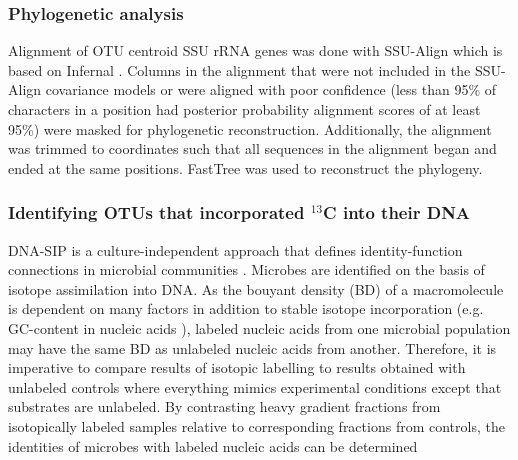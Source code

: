 \subsubsection{Phylogenetic analysis}
Alignment of OTU centroid SSU rRNA genes was done with SSU-Align which is based on Infernal
\citep{Nawrocki_2013,Nawrocki_2009}. Columns in the alignment that were not included in
the SSU-Align covariance models or were aligned with poor confidence (less than
95\% of characters in a position had posterior probability alignment scores of
at least 95\%) were masked for phylogenetic reconstruction. Additionally, the
alignment was trimmed to coordinates such that all sequences in the alignment
began and ended at the same positions. FastTree \citep{Price_2009} was used to
reconstruct the phylogeny.

\subsubsection{Identifying OTUs that incorporated $^{13}$C into their DNA}\label{fc}
DNA-SIP is a culture-independent approach that defines identity-function
connections in microbial communities
\citep{Buckley_2011,Neufeld_2007,Radajewski_2003}. Microbes are identified on
the basis of isotope assimilation into DNA. As the bouyant density (BD) of
a macromolecule is dependent on many factors in addition to stable isotope
incorporation (e.g. GC-content in nucleic acids \citep{Youngblut_2014}),
labeled nucleic acids from one microbial population may have the same BD as
unlabeled nucleic acids from another. Therefore, it is imperative to compare
results of isotopic labelling to results obtained with unlabeled controls where
everything mimics experimental conditions except that substrates are unlabeled.
By contrasting heavy gradient fractions from isotopically labeled samples
relative to corresponding fractions from controls, the identities of microbes
with labeled nucleic acids can be determined 

